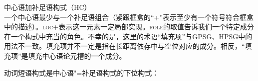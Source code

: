 \ea
中心语加补足语构式（HC）\\
\setlength{\fboxsep}{2mm}
\z
一个中心语最少与一个补足语组合（紧跟框盒的“+”表示至少有一个符号符合框盒中的描述）。\textsc{loc}+表示这一元素一定局部实现。\textsc{role}的取值告诉我们一个特定成分在一个构式中充当的角色。不幸的是，这里的术语“填充项”与GPSG、HPSG中的用法不一致。填充项并不一定是指在长距离依存中与空位对应的成分。相反，“填充项”是填充中心语论元槽的一个成分。

动词短语构式是中心语"=补足语构式的下位构式：
 
